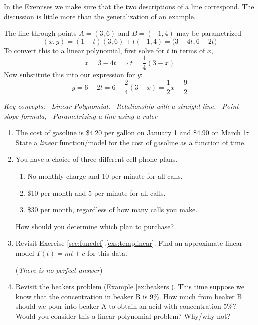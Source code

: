 In the Exercises we make sure that the two descriptions of a line correspond. The discussion is little more than the generalization of an example.

\begin{example}{}{}
	The line through points $A=(3,6)$ and $B=(-1,4)$ may be parametrized
	\[
		(x,y)=(1-t)(3,6)+t(-1,4)=\bigl(3-4t,6-2t\bigr)
	\]
	To convert this to a linear polynomial, first solve for $t$ in terms of $x$,
	\[
		x=3-4t\implies t=\frac 14(3-x)
	\]
	Now substitute this into our expression for $y$:
	\[
		y=6-2t=6-\frac 24(3-x) =\frac 12x-\frac 92
	\]
\end{example}


\vfil


\begin{exercises}{}{}
	\hangindent\leftmargini
	\emph{Key concepts: \ Linear Polynomial, \ Relationship with a straight line, \ Point-slope formula, \ Parametrizing a line using a ruler}


	\begin{enumerate}
	  \item The cost of gasoline is \$4.20 per gallon on January 1\st{} and \$4.90 on March 1\st. State a \emph{linear} function/model for the cost of gasoline as a function of time.

	  \item You have a choice of three different cell-phone plans.
	  \begin{enumerate}
	    \item No monthly charge and 10\textcent{} per minute for all calls.
	    \item \$10 per month and 5\textcent{} per minute for all calls.
	    \item \$30 per month, regardless of how many calls you make.
	  \end{enumerate}
	  How should you determine which plan to purchase?
	  
	  
	  \item Revisit Exercise \ref*{sec:funcdef}.\ref{exs:templinear}. Find an approximate linear model $T(t)=mt+c$ for this data.\par
	  (\emph{There is no perfect answer})
	  
	  
	  \item Revisit the beakers problem (Example \ref{ex:beakers}). This time suppose we know that the concentration in beaker B is 9\%. How much from beaker B should we pour into beaker A to obtain an acid with concentration 5\%? Would you consider this a linear polynomial problem? Why/why not?
    

\end{enumerate}
\end{exercises}
